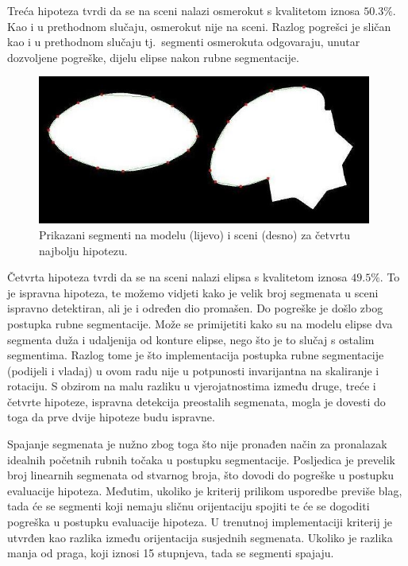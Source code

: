 \documentclass[lmodern, utf8, seminar, numeric]{fer}
\begin{document}
Treća hipoteza tvrdi da se na sceni nalazi osmerokut s kvalitetom iznosa $50.3\%$.
Kao i u prethodnom slučaju, osmerokut nije na sceni. Razlog pogrešci je sličan
kao i u prethodnom slučaju tj.\ segmenti osmerokuta odgovaraju, unutar dozvoljene
pogreške, dijelu elipse nakon rubne segmentacije.

\begin{figure}[!h]
\begin{center}
\includegraphics[width=11cm]{resources/elipsa-spoj.png}
\end{center}
\caption{Prikazani segmenti na modelu (lijevo) i sceni (desno) za četvrtu najbolju hipotezu.} 
\label{fig:segmenti-cetvrta}
\end{figure}

Četvrta hipoteza tvrdi da se na sceni nalazi elipsa s kvalitetom iznosa $49.5\%$.
To je ispravna hipoteza, te možemo vidjeti kako je velik broj segmenata u sceni
ispravno detektiran, ali je i određen dio promašen. Do pogreške je došlo zbog
postupka rubne segmentacije. Može se primijetiti kako su na modelu elipse dva
segmenta duža i udaljenija od konture elipse, nego što je to slučaj s ostalim
segmentima. Razlog tome je što implementacija postupka rubne segmentacije
(podijeli i vladaj) u ovom radu nije u potpunosti invarijantna na skaliranje i
rotaciju. S obzirom na malu razliku u vjerojatnostima između druge, treće i
četvrte hipoteze, ispravna detekcija preostalih segmenata, mogla je dovesti do
toga da prve dvije hipoteze budu ispravne.

Spajanje segmenata je nužno zbog toga što nije pronađen način za pronalazak
idealnih početnih rubnih točaka u postupku segmentacije. Posljedica je prevelik
broj linearnih segmenata od stvarnog broja, što dovodi do pogreške u postupku
evaluacije hipoteza. Međutim, ukoliko je kriterij prilikom usporedbe previše
blag, tada će se segmenti koji nemaju sličnu orijentaciju spojiti te će se
dogoditi pogreška u postupku evaluacije hipoteza. U trenutnoj implementaciji
kriterij je utvrđen kao razlika između orijentacija susjednih segmenata. Ukoliko
je razlika manja od praga, koji iznosi 15 stupnjeva, tada se segmenti spajaju.
\end{document}
